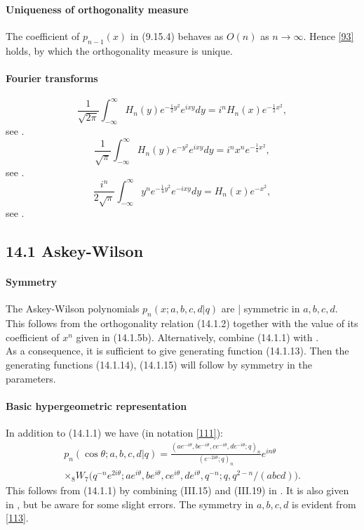 \documentclass[twoside,11pt]{article}
\newcommand\sa{\smallskipamount}
\newcommand\sLP{\\[\sa]}
\newcommand\tha\theta
\newcommand\half{\frac12}
\newcommand\iy\infty
\begin{document}
\paragraph{Uniqueness of orthogonality measure}
The coefficient of $p_{n-1}(x)$ in (9.15.4) behaves as $O(n)$ as $n\to\iy$.
Hence \eqref{93} holds, by which the orthogonality measure is unique.
%
\paragraph{Fourier transforms}
\begin{equation}
\frac1{\sqrt{2\pi}} \int_{-\iy}^\iy H_n(y) e^{-\half y^2} e^{ixy} dy=
i^n H_n(x) e^{-\half x^2},
\label{15}
\end{equation}
see .
\begin{equation}
\frac1{\sqrt\pi} \int_{-\iy}^\iy H_n(y) e^{-y^2} e^{ixy} dy=
i^n x^n e^{-\frac14 x^2},
\label{16}
\end{equation}
see .
\begin{equation}
\frac{i^n}{2\sqrt\pi} \int_{-\iy}^\iy y^n e^{-\frac14 y^2} e^{-ixy} dy=
H_n(x) e^{-x^2},
\label{17}
\end{equation}
see .
%
\subsection*{14.1 Askey-Wilson}
\label{sec14.1}
%
\paragraph{Symmetry}
The Askey-Wilson polynomials $p_n(x;a,b,c,d | q)$ are  | symmetric
in $a,b,c,d$.
\sLP
This follows from the orthogonality relation (14.1.2)
together with the value of its coefficient of $x^n$ given in (14.1.5b).
Alternatively, combine (14.1.1) with .\\
As a consequence, it is sufficient to give generating function (14.1.13). Then the generating
functions (14.1.14), (14.1.15) will follow by symmetry in the parameters.
%
\paragraph{Basic hypergeometric representation}
In addition to (14.1.1) we have (in notation \eqref{111}):
\begin{multline}
p_n(\cos\tha;a,b,c,d |  q)
=\frac{(ae^{-i\tha},be^{-i\tha},ce^{-i\tha},de^{-i\tha};q)_n}
{(e^{-2i\tha};q)_n} e^{in\tha}\\
\times {}_8W_7\big(q^{-n}e^{2i\tha};ae^{i\tha},be^{i\tha},
ce^{i\tha},de^{i\tha},q^{-n};q,q^{2-n}/(abcd)\big).
\label{113}
\end{multline}
This follows from (14.1.1) by combining (III.15) and (III.19) in
.
It is also given in , but be aware for some slight errors.
The symmetry in $a,b,c,d$ is evident from \eqref{113}.
%
\end{document}
